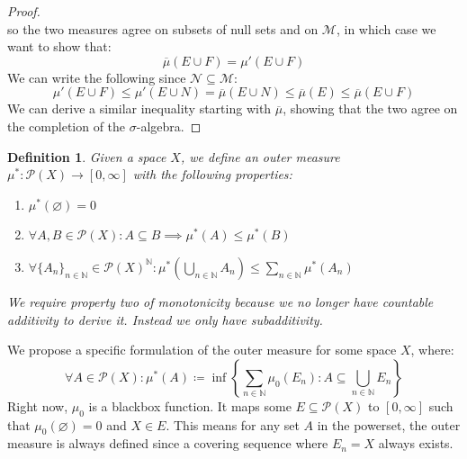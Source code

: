 \documentclass[10pt,letterpaper]{article} %
\newtheorem{defn}{Definition}[section]
\begin{document}
\begin{proof}
\begin{equation*}
\end{equation*}
so the two measures agree on subsets of null sets and on $\mathcal{M}$, in which case we want to show that:
\begin{equation*}
\overline{\mu}(E \cup F) = \mu'(E \cup F)
\end{equation*}
We can write the following since $\mathcal{N} \subseteq \mathcal{M}$:
\begin{equation*}
\mu'(E \cup F) \leqslant \mu'(E \cup N) = \overline{\mu}(E \cup N) \leqslant \overline{\mu}(E) \leqslant \overline{\mu}(E \cup F)
\end{equation*}
We can derive a similar inequality starting with $\overline{\mu}$, showing that the two agree on the completion of the $\sigma$-algebra.
\end{proof}

\begin{defn}
Given a space $X$, we define an outer measure $\mu^*: \mathcal{P}(X) \xrightarrow{} [0, \infty]$ with the following properties:
\begin{enumerate}
\item $\mu^*(\varnothing) = 0$
\item $\forall A, B \in \mathcal{P}(X): A \subseteq B \implies \mu^*(A) \leqslant \mu^*(B)$
\item $\forall \{A_n\}_{n \in \mathbb{N}} \in \mathcal{P}(X)^\mathbb{N}: \mu^*\left(\bigcup_{n \in \mathbb{N}}A_n\right) \leqslant \sum_{n \in \mathbb{N}}\mu^*(A_n)$
\end{enumerate}
We require property two of monotonicity because we no longer have countable additivity to derive it. Instead we only have subadditivity.
\end{defn}

We propose a specific formulation of the outer measure for some space $X$, where:
\begin{equation*}
\forall A \in \mathcal{P}(X): \mu^*(A) \coloneq \inf\left\{\sum_{n \in \mathbb{N}}\mu_0(E_n) : A \subseteq \bigcup_{n \in \mathbb{N}}E_n\right\}
\end{equation*}
Right now, $\mu_0$ is a blackbox function. It maps some $E \subseteq \mathcal{P}(X)$ to $[0, \infty]$ such that $\mu_0(\varnothing) = 0$ and $X \in E$.
This means for any set $A$ in the powerset, the outer measure is always defined since a covering sequence where $E_n = X$ always exists.
\end{document}
